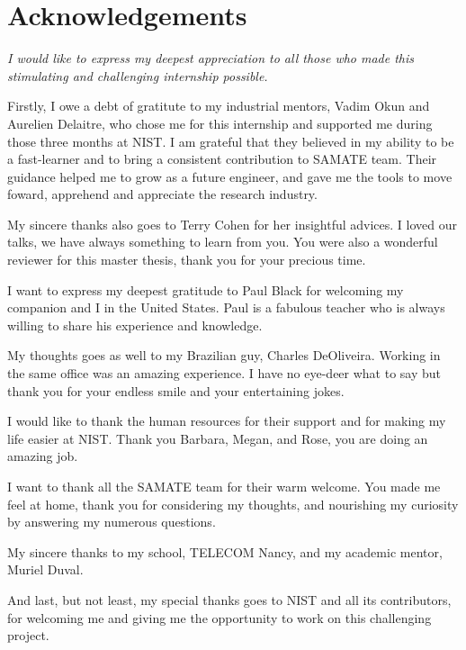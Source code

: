 \section*{Acknowledgements}

{\em
I would like to express my deepest appreciation to all those who made this stimulating and challenging internship possible.

Firstly, I owe a debt of gratitute to my industrial mentors, Vadim Okun and Aurelien Delaitre, who chose me for this internship and supported me during those three months at NIST. I am grateful that they believed in my ability to be a fast-learner and to bring a consistent contribution to SAMATE team. Their guidance helped me to grow as a future engineer, and gave me the tools to move foward, apprehend and appreciate the research industry.

My sincere thanks also goes to Terry Cohen for her insightful advices. I loved our talks, we have always something to learn from you. You were also a wonderful reviewer for this master thesis, thank you for your precious time.

I want to express my deepest gratitude to Paul Black for welcoming my companion and I in the United States. Paul is a fabulous teacher who is always willing to share his experience and knowledge.

My thoughts goes as well to my Brazilian guy, Charles DeOliveira. Working in the same office was an amazing experience. I have no eye-deer what to say but thank you for your endless smile and your entertaining jokes.

I would like to thank the human resources for their support and for making my life easier at NIST. Thank you Barbara, Megan, and Rose, you are doing an amazing job.

I want to thank all the SAMATE team for their warm welcome. You made me feel at home, thank you for considering my thoughts, and nourishing my curiosity by answering my numerous questions.

My sincere thanks to my school, TELECOM Nancy, and my academic mentor, Muriel Duval.

And last, but not least, my special thanks goes to NIST and all its contributors, for welcoming me and giving me the opportunity to work on this challenging project.
}

\cleardoublepage